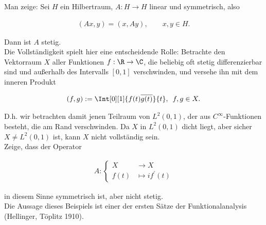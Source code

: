 \begin{exercise}

Man zeige:
Sei $H$ ein Hilbertraum, $A: H \to H$ linear und symmetrisch, also

\begin{align*}
  (A x, y) = (x, A y),
  \qquad
  x, y \in H.
\end{align*}

Dann ist $A$ stetig. \\

Die Vollständigkeit spielt hier eine entscheidende Rolle: Betrachte den Vektorraum $X$ aller Funktionen $f: \R \to \C$, die beliebig oft stetig differenzierbar sind und außerhalb des Intervalls $[0, 1]$ verschwinden, und versehe ihn mit dem inneren Produkt

\begin{align*}
  (f, g)
  :=
  \Int[0][1]{f(t) \overline{g(t)}}{t},
  \enspace
  f, g \in X.
\end{align*}

D.h. wir betrachten damit jenen Teilraum von $L^2(0,1)$, der aus $C^\infty$-Funktionen besteht, die am Rand verschwinden.
Da $X$ in $L^2(0,1)$ dicht liegt, aber sicher $X \neq L^2(0,1)$ ist, kann $X$ nicht vollständig sein. \\

Zeige, dass der Operator

\begin{align*}
  A:
  \begin{cases}
    X    & \to X \\
    f(t) & \mapsto if^{\prime}(t)
  \end{cases}
\end{align*}

in diesem Sinne symmetrisch ist, aber nicht stetig. \\

Die Aussage dieses Beispiels ist einer der ersten Sätze der Funktionalanalysis (Hellinger, Töplitz 1910).

\end{exercise}

